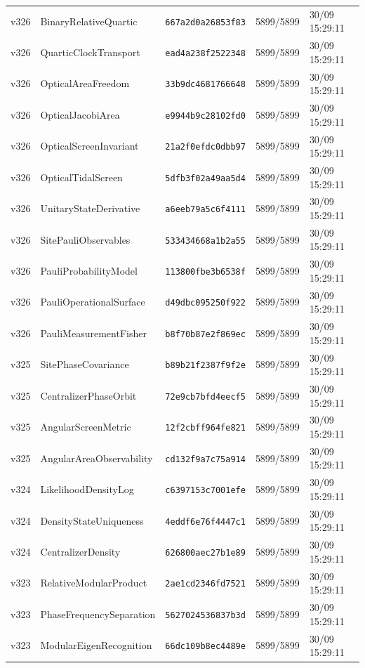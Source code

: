 \documentclass[11pt]{article}
\theoremstyle{definition}\newtheorem{deriv}{Derivation}
\begin{document}
{\begin{longtable}{@{}lllll@{}}
v326 & BinaryRelativeQuartic & \texttt{667a2d0a26853f83} & 5899/5899 & 30/09 15:29:11 \\
v326 & QuarticClockTransport & \texttt{ead4a238f2522348} & 5899/5899 & 30/09 15:29:11 \\
v326 & OpticalAreaFreedom & \texttt{33b9dc4681766648} & 5899/5899 & 30/09 15:29:11 \\
v326 & OpticalJacobiArea & \texttt{e9944b9c28102fd0} & 5899/5899 & 30/09 15:29:11 \\
v326 & OpticalScreenInvariant & \texttt{21a2f0efdc0dbb97} & 5899/5899 & 30/09 15:29:11 \\
v326 & OpticalTidalScreen & \texttt{5dfb3f02a49aa5d4} & 5899/5899 & 30/09 15:29:11 \\
v326 & UnitaryStateDerivative & \texttt{a6eeb79a5c6f4111} & 5899/5899 & 30/09 15:29:11 \\
v326 & SitePauliObservables & \texttt{533434668a1b2a55} & 5899/5899 & 30/09 15:29:11 \\
v326 & PauliProbabilityModel & \texttt{113800fbe3b6538f} & 5899/5899 & 30/09 15:29:11 \\
v326 & PauliOperationalSurface & \texttt{d49dbc095250f922} & 5899/5899 & 30/09 15:29:11 \\
v326 & PauliMeasurementFisher & \texttt{b8f70b87e2f869ec} & 5899/5899 & 30/09 15:29:11 \\
v325 & SitePhaseCovariance & \texttt{b89b21f2387f9f2e} & 5899/5899 & 30/09 15:29:11 \\
v325 & CentralizerPhaseOrbit & \texttt{72e9cb7bfd4eecf5} & 5899/5899 & 30/09 15:29:11 \\
v325 & AngularScreenMetric & \texttt{12f2cbff964fe821} & 5899/5899 & 30/09 15:29:11 \\
v325 & AngularAreaObservability & \texttt{cd132f9a7c75a914} & 5899/5899 & 30/09 15:29:11 \\
v324 & LikelihoodDensityLog & \texttt{c6397153c7001efe} & 5899/5899 & 30/09 15:29:11 \\
v324 & DensityStateUniqueness & \texttt{4eddf6e76f4447c1} & 5899/5899 & 30/09 15:29:11 \\
v324 & CentralizerDensity & \texttt{626800aec27b1e89} & 5899/5899 & 30/09 15:29:11 \\
v323 & RelativeModularProduct & \texttt{2ae1cd2346fd7521} & 5899/5899 & 30/09 15:29:11 \\
v323 & PhaseFrequencySeparation & \texttt{5627024536837b3d} & 5899/5899 & 30/09 15:29:11 \\
v323 & ModularEigenRecognition & \texttt{66dc109b8ec4489e} & 5899/5899 & 30/09 15:29:11 \\

\end{longtable}}
\end{document}
